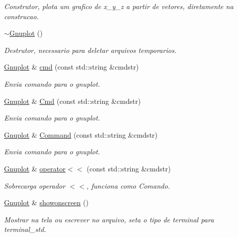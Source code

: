 \begin{DoxyCompactItemize}
\begin{DoxyCompactList}\small\item\em Construtor, plota um grafico de x\+\_\+y\+\_\+z a partir de vetores, diretamente na construcao. \end{DoxyCompactList}\item 
\hyperlink{class_gnuplot_a78a68f621caa87d1f34324fcd093c7bd}{$\sim$\+Gnuplot} ()
\begin{DoxyCompactList}\small\item\em Destrutor, necessario para deletar arquivos temporarios. \end{DoxyCompactList}\item 
\hyperlink{class_gnuplot}{Gnuplot} \& \hyperlink{class_gnuplot_a07607803ede8dd5416906df0a1924fc5}{cmd} (const std\+::string \&cmdstr)
\begin{DoxyCompactList}\small\item\em Envia comando para o gnuplot. \end{DoxyCompactList}\item 
\hyperlink{class_gnuplot}{Gnuplot} \& \hyperlink{class_gnuplot_af9ffb5b4c18cdf7c56e5c446f72e515d}{Cmd} (const std\+::string \&cmdstr)
\begin{DoxyCompactList}\small\item\em Envia comando para o gnuplot. \end{DoxyCompactList}\item 
\hyperlink{class_gnuplot}{Gnuplot} \& \hyperlink{class_gnuplot_a0d6db1521e789d7b73415ce85b723046}{Command} (const std\+::string \&cmdstr)
\begin{DoxyCompactList}\small\item\em Envia comando para o gnuplot. \end{DoxyCompactList}\item 
\hyperlink{class_gnuplot}{Gnuplot} \& \hyperlink{class_gnuplot_ae56495dc15f23d32f099129d3a50dd6c}{operator$<$$<$} (const std\+::string \&cmdstr)
\begin{DoxyCompactList}\small\item\em Sobrecarga operador $<$$<$, funciona como Comando. \end{DoxyCompactList}\item 
\hyperlink{class_gnuplot}{Gnuplot} \& \hyperlink{class_gnuplot_a356d2faaa79f08d13fec9718b776b28d}{showonscreen} ()
\begin{DoxyCompactList}\small\item\em Mostrar na tela ou escrever no arquivo, seta o tipo de terminal para terminal\+\_\+std. \end{DoxyCompactList}\item 

\end{DoxyCompactItemize}
